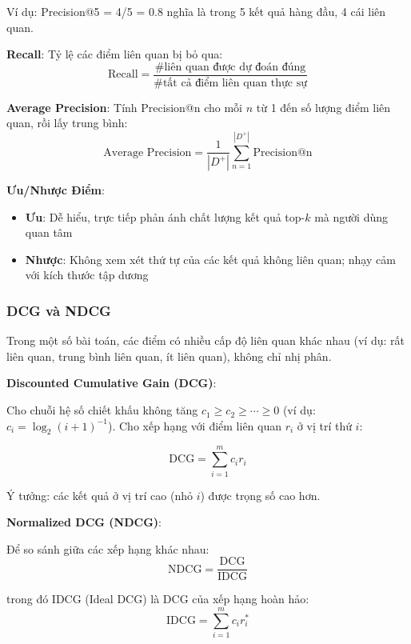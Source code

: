 Ví dụ: Precision@5 = 4/5 = 0.8 nghĩa là trong 5 kết quả hàng đầu, 4 cái liên quan.

\textbf{Recall}: Tỷ lệ các điểm liên quan bị bỏ qua:
\begin{equation}
\text{Recall} = \frac{\#\text{liên quan được dự đoán đúng}}{\text{\#tất cả điểm liên quan thực sự}}
\end{equation}

\textbf{Average Precision}: Tính Precision@n cho mỗi $n$ từ 1 đến số lượng điểm liên quan, rồi lấy trung bình:
\begin{equation}
\text{Average Precision} = \frac{1}{|D^+|} \sum_{n=1}^{|D^+|} \text{Precision@n}
\end{equation}

\textbf{Ưu/Nhược Điểm}:
\begin{itemize}
    \item \textbf{Ưu}: Dễ hiểu, trực tiếp phản ánh chất lượng kết quả top-$k$ mà người dùng quan tâm
    \item \textbf{Nhược}: Không xem xét thứ tự của các kết quả không liên quan; nhạy cảm với kích thước tập dương
\end{itemize}

\subsubsection{DCG và NDCG}

Trong một số bài toán, các điểm có nhiều cấp độ liên quan khác nhau (ví dụ: rất liên quan, trung bình liên quan, ít liên quan), không chỉ nhị phân.

\textbf{Discounted Cumulative Gain (DCG)}: 

Cho chuỗi hệ số chiết khấu không tăng $c_1 \geq c_2 \geq \cdots \geq 0$ (ví dụ: $c_i = \log_2(i+1)^{-1}$). Cho xếp hạng với điểm liên quan $r_i$ ở vị trí thứ $i$:

\begin{equation}
\text{DCG} = \sum_{i=1}^{m} c_i r_i
\end{equation}

Ý tưởng: các kết quả ở vị trí cao (nhỏ $i$) được trọng số cao hơn.

\textbf{Normalized DCG (NDCG)}:

Để so sánh giữa các xếp hạng khác nhau:
\begin{equation}
\text{NDCG} = \frac{\text{DCG}}{\text{IDCG}}
\end{equation}

trong đó IDCG (Ideal DCG) là DCG của xếp hạng hoàn hảo:
\begin{equation}
\text{IDCG} = \sum_{i=1}^{m} c_i r^*_i
\end{equation}


